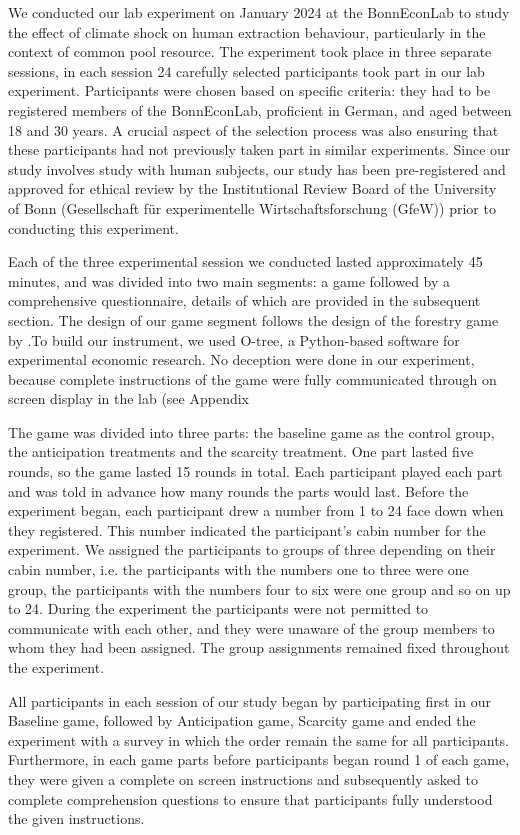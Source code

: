 We conducted our lab experiment on January 2024 at the BonnEconLab to study the effect of climate shock on human extraction behaviour, particularly in the context of common pool resource. The experiment took place in three separate sessions, in each session 24 carefully selected participants took part in our lab experiment. Participants were chosen based on specific criteria: they had to be registered members of the BonnEconLab, proficient in German, and aged between 18 and 30 years. A crucial aspect of the selection process was also ensuring that these participants had not previously taken part in similar experiments. Since our study involves study with human subjects, our study has been pre-registered and approved for ethical review by the Institutional Review Board of the University of Bonn (Gesellschaft f\"ur experimentelle Wirtschaftsforschung (GfeW)) prior to conducting this experiment.

 Each of the three experimental session we conducted lasted approximately 45 minutes, and was divided into two main segments: a game followed by a comprehensive questionnaire, details of which are provided in the subsequent section. The design of our game segment follows the design of the forestry game by \citet{janssen2013breaking}.To build our instrument, we used O-tree, a Python-based software for experimental economic research\citet{chen2016otree}. No deception were done in our experiment, because complete instructions of the game were fully communicated through on screen display in the lab (see Appendix %

 The game was divided into three parts: the baseline game as the control group, the anticipation treatments and the scarcity treatment. One part lasted five rounds, so the game lasted 15 rounds in total. Each participant played each part and was told in advance how many rounds the parts would last. Before the experiment began, each participant drew a number from 1 to 24 face down when they registered. This number indicated the participant’s cabin number for the experiment. We assigned the participants to groups of three depending on their cabin number, i.e. the participants with the numbers one to three were one group, the participants with the numbers four to six were one group and so on up to
24. During the experiment the participants were not permitted to communicate with each other, and
they were unaware of the group members to whom they had been assigned. The group assignments
remained fixed throughout the experiment.

All participants in each session of our study began by participating first in our Baseline game, followed by Anticipation game, Scarcity game and ended the experiment with a survey in which the order remain the same for all participants. Furthermore, in each game parts before participants began round 1 of each game, they were given a complete on screen instructions and subsequently asked to complete comprehension questions to ensure that participants fully understood the given instructions.
